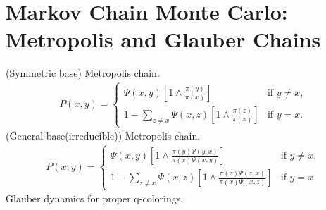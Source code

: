 \documentclass[paper=a4, fontsize=11pt]{scrartcl} %
\numberwithin{equation}{section} %
\numberwithin{figure}{section} %
\numberwithin{table}{section} %
\begin{document}
\section{Markov Chain Monte Carlo: Metropolis and Glauber Chains}
(Symmetric base) Metropolis chain.
\begin{align}
	P(x,y) = \begin{cases} \Psi(x,y)[1\wedge \frac{\pi(y)}{\pi(x)}] &\mbox{if $y\neq x$,}\\
		1 - \sum_{z\neq x} \Psi(x,z)[1\wedge \frac{\pi(z)}{\pi(x)}] &\mbox{if $y=x$.}\end{cases}
\end{align}
(General base(irreducible)) Metropolis chain.
\begin{align}
	P(x,y) = \begin{cases} \Psi(x,y)[1\wedge \frac{\pi(y)\Psi(y,x)}{\pi(x)\Psi(x,y)}] &\mbox{if $y\neq x$,}\\
		1 - \sum_{z\neq x} \Psi(x,z)[1\wedge \frac{\pi(z)\Psi(z,x)}{\pi(x)\Psi(x,z)}] &\mbox{if $y=x$.}\end{cases}
\end{align}
Glauber dynamics for proper q-colorings.\\
\end{document}
